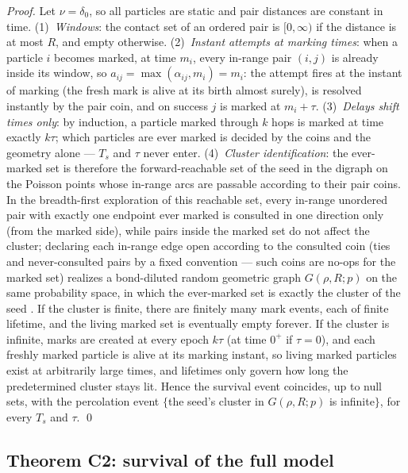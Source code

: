 \documentclass[11pt]{article}
\newcommand{\Ts}{T_s}
\begin{document}
\noindent\emph{Proof.} Let $\nu=\delta_0$, so all particles are static and
pair distances are constant in time. (1)~\emph{Windows}: the contact set of
an ordered pair is $[0,\infty)$ if the distance is at most $R$, and empty
otherwise. (2)~\emph{Instant attempts at marking times}: when a particle
$i$ becomes marked, at time $m_i$, every in-range pair $(i,j)$ is already
inside its window, so $a_{ij}=\max(\alpha_{ij},m_i)=m_i$: the attempt fires
at the instant of marking (the fresh mark is alive at its birth almost
surely), is resolved instantly by the pair coin, and on success $j$ is
marked at $m_i+\tau$. (3)~\emph{Delays shift times only}: by induction,
a particle marked through $k$ hops is marked at time exactly $k\tau$; which
particles are ever marked is decided by the coins and the geometry alone
--- $\Ts$ and $\tau$ never enter. (4)~\emph{Cluster identification}: the
ever-marked set is therefore the forward-reachable set of the seed in the
digraph on the Poisson points whose in-range arcs are passable according to
their pair coins. In the breadth-first exploration of this reachable set,
every in-range unordered pair with exactly one endpoint ever marked is
consulted in one direction only (from the marked side), while pairs inside
the marked set do not affect the cluster; declaring each in-range edge open
according to the consulted coin (ties and never-consulted pairs by a fixed
convention --- such coins are no-ops for the marked set) realizes a
bond-diluted random geometric graph $G(\rho,R;p)$ on the same probability
space, in which the ever-marked set is exactly the cluster of the seed
\cite{penrose,meesterroy}. If the cluster is finite, there are finitely
many mark events, each of finite lifetime, and the living marked set is
eventually empty forever. If the cluster is infinite, marks are created at
every epoch $k\tau$ (at time $0^+$ if $\tau=0$), and each freshly marked
particle is alive at its marking instant, so living marked particles exist
at arbitrarily large times, and lifetimes only govern how long the predetermined
cluster stays lit. Hence the survival event coincides, up to null sets,
with the percolation event $\{$the seed's cluster in $G(\rho,R;p)$ is
infinite$\}$, for every $\Ts$ and $\tau$. \qed

\subsection{Theorem C2: survival of the full model}\label{app:thmC2}
\end{document}
